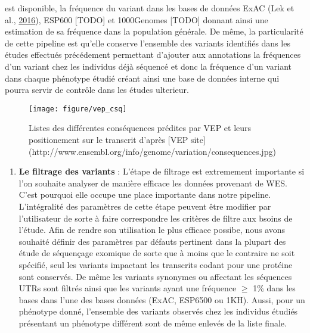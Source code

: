 \documentclass[12pt,twoside]{reedthesis}
\providecommand{\tightlist}{%
  \setlength{\itemsep}{0pt}\setlength{\parskip}{0pt}}
\theoremstyle{definition}
\theoremstyle{definition}
\theoremstyle{remark}
\begin{document}
\begin{enumerate}
    est disponible, la fréquence du variant dans les bases de données ExAC
    (Lek et al., \protect\hyperlink{ref-Lek2016}{2016}), ESP600 {[}TODO{]}
    et 1000Genomes {[}TODO{]} donnant ainsi une estimation de sa fréquence
    dans la population générale. De même, la particularité de cette
    pipeline est qu'elle conserve l'ensemble des variants identifiés dans
    les études effectués précédement permettant d'ajouter aux annotations
    la fréquences d'un variant chez les individus déjà séquencé et donc la
    fréquence d'un variant dans chaque phénotype étudié créant ainsi une
    base de données interne qui pourra servir de contrôle dans les études
    ulterieur.
  \end{enumerate}
  
  \begin{figure}
  
  {\centering \texttt{[image: figure/vep\_csq]} 
  
  }
  
  \caption[Listes des différentes conséquences prédites par VEP et leurs positionement sur le transcrit]{Listes des différentes conséquences prédites par VEP et leurs positionement sur le transcrit d'après [VEP site](http://www.ensembl.org/info/genome/variation/consequences.jpg)}\label{fig:figvepcsq}
  \end{figure}
  
  \begin{enumerate}
  \def\labelenumi{\arabic{enumi}.}
  \setcounter{enumi}{3}
  \tightlist
  \item
    \textbf{Le filtrage des variants} : L'étape de filtrage est
    extremement importante si l'on souhaite analyser de manière efficace
    les données provenant de WES. C'est pourquoi elle occupe une place
    importante dans notre pipeline. L'intégralité des paramètres de cette
    étape peuvent être modifier par l'utilisateur de sorte à faire
    correspondre les critères de filtre aux bsoins de l'étude. Afin de
    rendre son utilisation le plus efficace possibe, nous avons souhaité
    définir des paramètres par défauts pertinent dans la plupart des étude
    de séquençage exomique de sorte que à moins que le contraire ne soit
    spécifié, seul les variants impactant les transcrits codant pour une
    protéine sont conservés. De même les variants synonymes ou affectant
    les séquences UTRs sont filtrés ainsi que les variants ayant une
    fréquence \(\ge\) 1\% dans les bases dans l'une des bases données
    (ExAC, ESP6500 ou 1KH). Aussi, pour un phénotype donné, l'ensemble des
    variants observés chez les individus étudiés présentant un phénotype
    différent sont de même enlevés de la liste finale.
  \end{enumerate}
  
\end{document}
